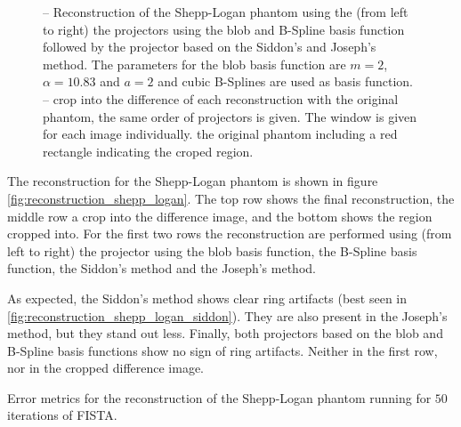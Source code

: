 \begin{figure}[h]

	\caption{--
		Reconstruction of the Shepp-Logan phantom using the (from left to right) the
		projectors using the blob and B-Spline basis function followed by the projector
		based on the Siddon's and Joseph's method.
		The parameters for the blob basis function are
		\(m=2\), \(\alpha=10.83\) and \(a=2\) and cubic B-Splines are used as basis
		function.
		--
		crop into the difference of each reconstruction with the original phantom, the same
		order of projectors is given. The window is given for each image individually.
		 the original phantom including a red
		rectangle indicating the croped region.
	}%
	\label{fig:reconstruction_shepp_logan}
\end{figure}

The reconstruction for the Shepp-Logan phantom is shown in figure
\autoref{fig:reconstruction_shepp_logan}. The top row shows the final reconstruction, the middle row
a crop into the difference image, and the bottom shows the region cropped into. For the first two
rows the reconstruction are performed using (from left to right) the projector using the blob basis
function, the B-Spline basis function, the Siddon's method and the Joseph's method.

As expected, the Siddon's method shows clear ring artifacts (best seen in
\autoref{fig:reconstruction_shepp_logan_siddon}). They are also present in the Joseph's method, but
they stand out less. Finally, both projectors based on the blob and B-Spline basis functions show no
sign of ring artifacts. Neither in the first row, nor in the cropped difference image.

\begin{table}[h]%
	\centering
	\caption{Error metrics for the reconstruction of the Shepp-Logan phantom running for \(50\)
		iterations of FISTA.}%
	\label{tab:error_metric_shepp_logan}
\end{table}

